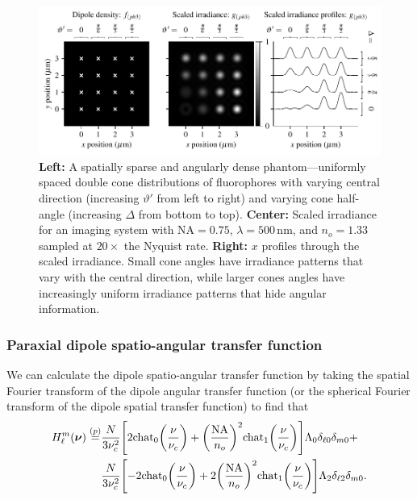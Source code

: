 \documentclass[]{osa-article}
\let\originalleft\left
\let\originalright\right
\renewcommand{\left}{\mathopen{}\mathclose\bgroup\originalleft}
\renewcommand{\right}{\aftergroup\egroup\originalright}
\providecommand{\bs}[1]{\boldsymbol{#1}}
\providecommand{\bv}{\bs{\nu}}
\begin{document}
  \begin{figure}[h]
 \centering
   \centering
   \includegraphics[scale=0.8]{../figures/paratfs/ph3.pdf}
   \caption{\textbf{Left:} A spatially sparse and angularly dense
     phantom---uniformly spaced double cone distributions of fluorophores with
     varying central direction (increasing $\vartheta'$ from left to right) and
     varying cone half-angle (increasing $\Delta$ from bottom to top).
     \textbf{Center:} Scaled irradiance for an imaging system with
     $\text{NA} = 0.75$, $\lambda = 500\,\text{nm}$, and $n_o = 1.33$ sampled at
     $20\times$ the Nyquist rate. \textbf{Right:} $x$ profiles through the
     scaled irradiance. Small cone angles have irradiance patterns that vary
     with the central direction, while larger cones angles have increasingly
     uniform irradiance patterns that hide angular information.}
   \label{fig:ph3}
 \end{figure}

 \subsubsection{Paraxial dipole spatio-angular transfer function}
 We can calculate the dipole spatio-angular transfer function by taking the
 spatial Fourier transform of the dipole angular transfer function (or the
 spherical Fourier transform of the dipole spatial transfer function) to find
 that
 \begin{align}
H_{\ell}^m(\bv) \stackrel{(p)}{=} &\frac{N}{3\nu_c^2}\left[2\text{chat}_0\left(\frac{\nu}{\nu_c}\right) + \left(\frac{\text{NA}}{n_o}\right)^2\text{chat}_1\left(\frac{\nu}{\nu_c}\right)\right]\Lambda_0\delta_{\ell0}\delta_{m0}+\nonumber\\ &\frac{N}{3\nu_c^2}\left[-2\text{chat}_0\left(\frac{\nu}{\nu_c}\right) + 2\left(\frac{\text{NA}}{n_o}\right)^2\text{chat}_1\left(\frac{\nu}{\nu_c}\right)\right]\Lambda_2\delta_{\ell2}\delta_{m0}.
 \end{align}
\end{document}
